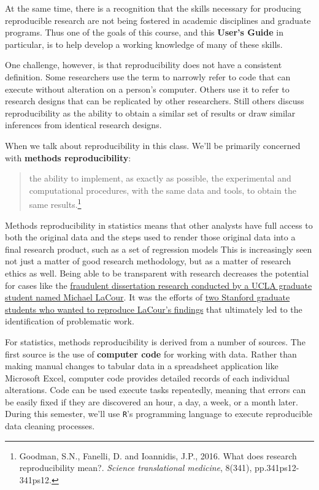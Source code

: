 \documentclass[]{book}
\let\rmarkdownfootnote\footnote%
\def\footnote{\protect\rmarkdownfootnote}
\theoremstyle{definition}
\theoremstyle{definition}
\theoremstyle{definition}
\theoremstyle{remark}
\begin{document}
At the same time, there is a recognition that the skills necessary for
producing reproducible research are not being fostered in academic
disciplines and graduate programs. Thus one of the goals of this course,
and this \textbf{User's Guide} in particular, is to help develop a
working knowledge of many of these skills.

One challenge, however, is that reproducibility does not have a
consistent definition. Some researchers use the term to narrowly refer
to code that can execute without alteration on a person's computer.
Others use it to refer to research designs that can be replicated by
other researchers. Still others discuss reproducibility as the ability
to obtain a similar set of results or draw similar inferences from
identical research designs.

When we talk about reproducibility in this class. We'll be primarily
concerned with \textbf{methods reproducibility}:

\begin{quote}
the ability to implement, as exactly as possible, the experimental and
computational procedures, with the same data and tools, to obtain the
same results.\footnote{Goodman, S.N., Fanelli, D. and Ioannidis, J.P.,
  2016. What does research reproducibility mean?. \emph{Science
  translational medicine}, 8(341), pp.341ps12-341ps12.}
\end{quote}

Methods reproducibility in statistics means that other analysts have
full access to both the original data and the steps used to render those
original data into a final research product, such as a set of regression
models This is increasingly seen not just a matter of good research
methodology, but as a matter of research ethics as well. Being able to
be transparent with research decreases the potential for cases like the
\href{http://nymag.com/scienceofus/2015/05/how-a-grad-student-uncovered-a-huge-fraud.html}{fraudulent
dissertation research conducted by a UCLA graduate student named Michael
LaCour}. It was the efforts of
\href{https://fivethirtyeight.com/features/how-two-grad-students-uncovered-michael-lacour-fraud-and-a-way-to-change-opinions-on-transgender-rights/}{two
Stanford graduate students who wanted to reproduce LaCour's findings}
that ultimately led to the identification of problematic work.

For statistics, methods reproducibility is derived from a number of
sources. The first source is the use of \textbf{computer code} for
working with data. Rather than making manual changes to tabular data in
a spreadsheet application like Microsoft Excel, computer code provides
detailed records of each individual alterations. Code can be used
execute tasks repeatedly, meaning that errors can be easily fixed if
they are discovered an hour, a day, a week, or a month later. During
this semester, we'll use \texttt{R}'s programming language to execute
reproducible data cleaning processes.
\end{document}
